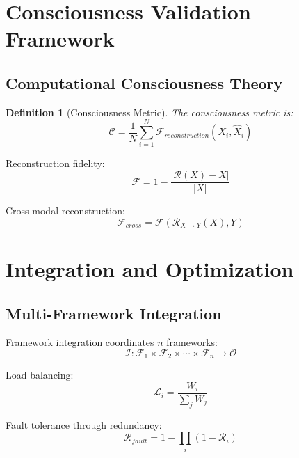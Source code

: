 \documentclass[12pt]{article}
\newtheorem{definition}[theorem]{Definition}
\begin{document}
\section{Consciousness Validation Framework}

\subsection{Computational Consciousness Theory}

\begin{definition}[Consciousness Metric]
The consciousness metric is:
\begin{equation}
\mathcal{C} = \frac{1}{N} \sum_{i=1}^{N} \mathcal{F}_{reconstruction}(X_i, \hat{X}_i)
\end{equation}
\end{definition}

Reconstruction fidelity:
\begin{equation}
\mathcal{F} = 1 - \frac{|\mathcal{R}(X) - X|}{|X|}
\end{equation}

Cross-modal reconstruction:
\begin{equation}
\mathcal{F}_{cross} = \mathcal{F}(\mathcal{R}_{X \rightarrow Y}(X), Y)
\end{equation}

\section{Integration and Optimization}

\subsection{Multi-Framework Integration}

Framework integration coordinates $n$ frameworks:
\begin{equation}
\mathcal{I}: \mathcal{F}_1 \times \mathcal{F}_2 \times \cdots \times \mathcal{F}_n \rightarrow \mathcal{O}
\end{equation}

Load balancing:
\begin{equation}
\mathcal{L}_i = \frac{W_i}{\sum_j W_j}
\end{equation}

Fault tolerance through redundancy:
\begin{equation}
\mathcal{R}_{fault} = 1 - \prod_i (1 - \mathcal{R}_i)
\end{equation}
\end{document}
